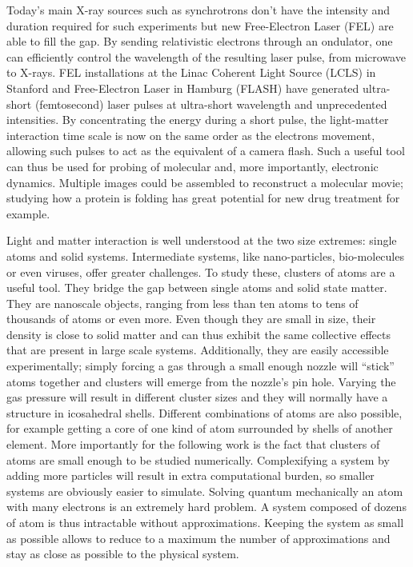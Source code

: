 Today's main X-ray sources such as synchrotrons don't have the intensity and
duration required for such experiments but new Free-Electron Laser (FEL) are
able to fill the gap. By sending relativistic electrons through an ondulator,
one can efficiently control the wavelength of the resulting laser pulse, from
microwave to X-rays\cite{Ackermann2007a}. FEL installations at the Linac
Coherent Light Source (LCLS) in Stanford and Free-Electron Laser in Hamburg
(FLASH) have generated ultra-short (femtosecond) laser pulses at ultra-short
wavelength and unprecedented intensities. By concentrating the energy during a
short pulse, the light-matter interaction time scale is now on the same order
as the electrons movement, allowing such pulses to act as the equivalent of a
camera flash. Such a useful tool can thus be used for probing of molecular
and, more importantly, electronic dynamics\cite{Chapman2011}. Multiple
images could be assembled to reconstruct a molecular movie; studying how a
protein is folding has great potential for new drug treatment for
example\citeneeded.

Light and matter interaction is well understood at the two size extremes:
single atoms and solid systems. Intermediate systems, like nano-particles,
bio-molecules or even viruses\cite{Seibert2011}, offer greater challenges. To
study these, clusters of atoms are a useful tool. They bridge the gap between
single atoms and solid state matter. They are nanoscale objects, ranging from
less than ten atoms to tens of thousands of atoms or even more. Even though
they are small in size, their density is close to solid matter and can thus
exhibit the same collective effects that are present in large scale
systems\cite{Reinhard2004}. Additionally, they are easily accessible
experimentally; simply forcing a gas through a small enough nozzle will
``stick'' atoms together and clusters will emerge from the nozzle's pin
hole. Varying the gas pressure will result in different cluster sizes
and they will normally have a structure in icosahedral
shells\cite{Reinhard2004}.
Different combinations of atoms are also possible, for example getting a core of
one kind of atom surrounded by shells of another element. More importantly for
the following work is the fact that clusters of atoms are small enough to be
studied numerically. Complexifying a system by adding more particles will
result in extra computational burden, so smaller systems are obviously easier
to simulate. Solving quantum mechanically an atom with many electrons is an
extremely hard problem. A system composed of dozens of atom is thus intractable
without approximations. Keeping the system as small as possible allows to
reduce to a maximum the number of approximations and stay as close as possible
to the physical system.

